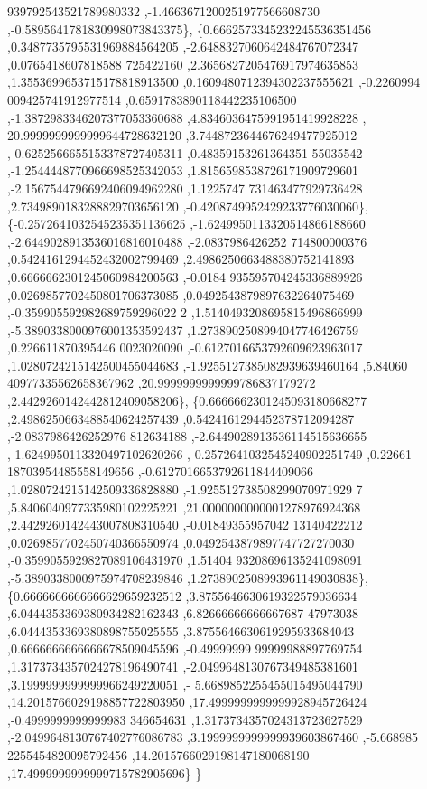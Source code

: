 \begin{DoxyCode}
      939792543521789980332 ,-1.4663671200251977566608730 ,-0.5895641781830998073843375\},
\{0.6662573345232245536351456 ,0.3487735795531969884564205 ,-2.6488327060642484767072347 ,0.0765418607818588
      725422160 ,2.3656827205476917974635853 ,1.3553699653715178818913500 ,0.1609480712394302237555621 ,-0.2260994
      009425741912977514 ,0.6591783890118442235106500 ,-1.3872983346207377053360688 ,4.8346036475991951419928228 ,
      20.9999999999999644728632120 ,3.7448723644676249477925012 ,-0.6252566655153378727405311 ,0.48359153261364351
      55035542 ,-1.2544448770966698525342053 ,1.8156598538726171909729601 ,-2.1567544796692406094962280 ,1.1225747
      731463477929736428 ,2.7349890183288829703656120 ,-0.4208749952429233776030060\},
\{-0.2572641032545235351136625 ,-1.6249950113320514866188660 ,-2.6449028913536016816010488 ,-2.0837986426252
      714800000376 ,0.5424161294452432002799469 ,2.4986250663488380752141893 ,0.6666662301245060984200563 ,-0.0184
      935595704245336889926 ,0.0269857702450801706373085 ,0.0492543879897632264075469 ,-0.359905592982689759296022
      2 ,1.5140493208695815496866999 ,-5.3890338000976001353592437 ,1.2738902508994047746426759 ,0.226611870395446
      0023020090 ,-0.6127016653792609623963017 ,1.0280724215142500455044683 ,-1.9255127385082939639460164 ,5.84060
      40977335562658367962 ,20.9999999999999786837179272 ,2.4429260142442812409058206\},
\{0.6666662301245093180668277 ,2.4986250663488540624257439 ,0.5424161294452378712094287 ,-2.0837986426252976
      812634188 ,-2.6449028913536114515636655 ,-1.6249950113320497102620266 ,-0.2572641032545240902251749 ,0.22661
      18703954485558149656 ,-0.6127016653792611844409066 ,1.0280724215142509336828880 ,-1.925512738508299070971929
      7 ,5.8406040977335980102225221 ,21.0000000000001278976924368 ,2.4429260142443007808310540 ,-0.01849355957042
      13140422212 ,0.0269857702450740366550974 ,0.0492543879897747727270030 ,-0.3599055929827089106431970 ,1.51404
      93208696135241098091 ,-5.3890338000975974708239846 ,1.2738902508993961149030838\},
\{0.6666666666666629659232512 ,3.8755646630619322579036634 ,6.0444353369380934282162343 ,6.82666666666667687
      47973038 ,6.0444353369380898755025555 ,3.8755646630619295933684043 ,0.6666666666666678509045596 ,-0.49999999
      99999988897769754 ,1.3173734357024278196490741 ,-2.0499648130767349485381601 ,3.1999999999999966249220051 ,-
      5.6689852255455015495044790 ,14.2015766029198857722803950 ,17.4999999999999928945726424 ,-0.4999999999999983
      346654631 ,1.3173734357024313723627529 ,-2.0499648130767402776086783 ,3.1999999999999939603867460 ,-5.668985
      2255454820095792456 ,14.2015766029198147180068190 ,17.4999999999999715782905696\}
\}
\end{DoxyCode}
\mbox{\label{a00461_afe5f9353c0b274c0af00660b5538da55}} 

